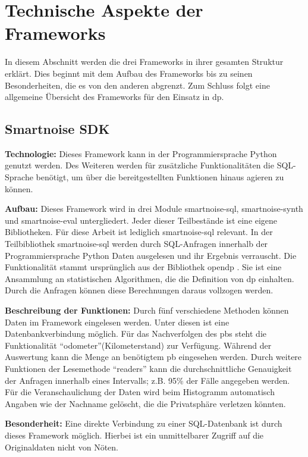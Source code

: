 \section{Technische Aspekte der Frameworks}
In diesem Abschnitt werden die drei Frameworks in ihrer gesamten Struktur erklärt. Dies beginnt mit dem Aufbau des Frameworks bis zu seinen Besonderheiten, die es von den anderen abgrenzt. Zum Schluss folgt eine allgemeine Übersicht des Frameworks für den Einsatz in \gls{dp}.
\subsection{Smartnoise SDK}
\textbf{Technologie: }
Dieses Framework \parencite{Smartnoise}  kann in der Programmiersprache Python genutzt werden. Des Weiteren werden für zusätzliche Funktionalitäten die SQL-Sprache benötigt, um über die bereitgestellten Funktionen hinaus agieren zu können.

\textbf{Aufbau: }
Dieses Framework wird in drei Module smartnoise-sql, smartnoise-synth und smartnoise-eval untergliedert. Jeder dieser Teilbestände ist eine eigene Bibliotheken. Für diese Arbeit ist lediglich smartnoise-sql relevant. In der Teilbibliothek smartnoise-sql werden durch SQL-Anfragen innerhalb der Programmiersprache Python Daten ausgelesen und ihr Ergebnis verrauscht. Die Funktionalität stammt ursprünglich aus der Bibliothek \gls{opendp} \parencite{OpenDP}. Sie ist eine Ansammlung an statistischen Algorithmen, die die Definition von \gls{dp} einhalten. Durch die Anfragen können diese Berechnungen daraus vollzogen werden. 

\textbf{Beschreibung der Funktionen: }
Durch fünf verschiedene Methoden können Daten im Framework eingelesen werden. Unter diesen ist eine Datenbankverbindung möglich. Für das Nachverfolgen des \gls{pb}s steht die Funktionalität \enquote{odometer}(Kilometerstand) zur Verfügung. Während der Auswertung kann die Menge an benötigtem \gls{pb} eingesehen werden. Durch weitere Funktionen der Lesemethode \enquote{readers} kann die durchschnittliche Genauigkeit der Anfragen innerhalb eines Intervalls; z.B. 95\% der Fälle angegeben werden. Für die Veranschaulichung der Daten wird beim Histogramm automatisch Angaben wie der Nachname gelöscht, die die Privatsphäre verletzen könnten.

\textbf{Besonderheit: }
Eine direkte Verbindung zu einer SQL-Datenbank ist durch dieses Framework möglich. Hierbei ist ein unmittelbarer Zugriff auf die Originaldaten nicht von Nöten.

